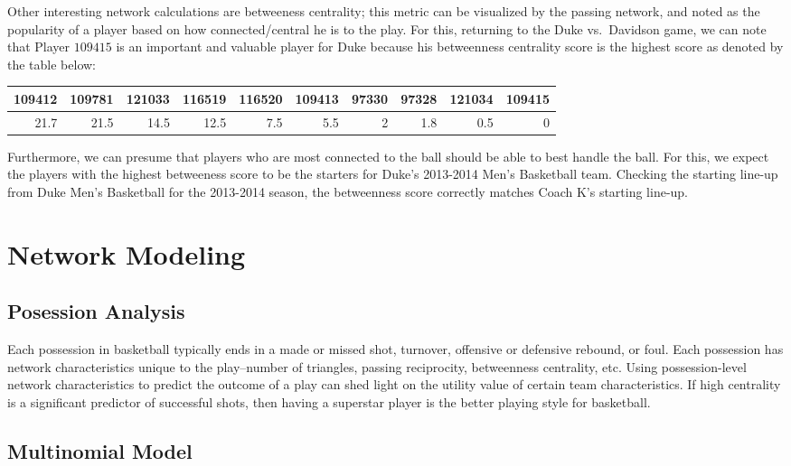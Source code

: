 \documentclass[12pt,twoside]{dukestatscithesis}
\theoremstyle{definition}
\theoremstyle{definition}
\theoremstyle{definition}
\theoremstyle{remark}
\begin{document}
Other interesting network calculations are betweeness centrality; this
metric can be visualized by the passing network, and noted as the
popularity of a player based on how connected/central he is to the play.
For this, returning to the Duke vs.~Davidson game, we can note that
Player \(109415\) is an important and valuable player for Duke because
his betweenness centrality score is the highest score as denoted by the
table below:
\begin{tabular}{r|r|r|r|r|r|r|r|r|r}
\hline
109412 & 109781 & 121033 & 116519 & 116520 & 109413 & 97330 & 97328 & 121034 & 109415\\
\hline
21.7 & 21.5 & 14.5 & 12.5 & 7.5 & 5.5 & 2 & 1.8 & 0.5 & 0\\
\hline
\end{tabular}
Furthermore, we can presume that players who are most connected to the
ball should be able to best handle the ball. For this, we expect the
players with the highest betweeness score to be the starters for Duke's
2013-2014 Men's Basketball team. Checking the starting line-up from Duke
Men's Basketball for the 2013-2014 season, the betweenness score
correctly matches Coach K's starting line-up.

\chapter{Network Modeling}\label{network-modeling}

\section{Posession Analysis}\label{posession-analysis}

Each possession in basketball typically ends in a made or missed shot,
turnover, offensive or defensive rebound, or foul. Each possession has
network characteristics unique to the play--number of triangles, passing
reciprocity, betweenness centrality, etc. Using possession-level network
characteristics to predict the outcome of a play can shed light on the
utility value of certain team characteristics. If high centrality is a
significant predictor of successful shots, then having a superstar
player is the better playing style for basketball.

\section{Multinomial Model}\label{multinomial-model}
\end{document}
